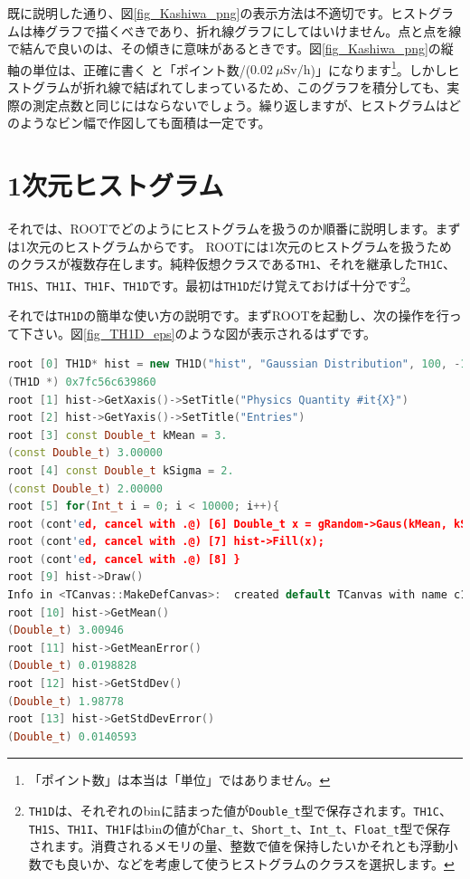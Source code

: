 既に説明した通り、図\ref{fig_Kashiwa_png}の表示方法は不適切です。ヒストグラムは棒グラフで描くべきであり、折れ線グラフにしてはいけません。点と点を線で結んで良いのは、その傾きに意味があるときです。図\ref{fig_Kashiwa_png}の縦軸の単位は、正確に書く と「ポイント数/($0.02\ \mu\mathrm{Sv/h}$)」になります\footnote{「ポイント数」は本当は「単位」ではありません。}。しかしヒストグラムが折れ線で結ばれてしまっているため、このグラフを積分しても、実際の測定点数と同じにはならないでしょう。繰り返しますが、ヒストグラムはどのようなビン幅で作図しても面積は一定です。

\section{1次元ヒストグラム}

それでは、ROOTでどのようにヒストグラムを扱うのか順番に説明します。まずは1次元のヒストグラムからです。 ROOTには1次元のヒストグラムを扱うためのクラスが複数存在します。純粋仮想クラスである\texttt{TH1}、それを継承した\texttt{TH1C}、\texttt{TH1S}、\texttt{TH1I}、\texttt{TH1F}、\texttt{TH1D}です。最初は\texttt{TH1D}だけ覚えておけば十分です\footnote{\texttt{TH1D}は、それぞれのbinに詰まった値が\texttt{Double\_t}型で保存されます。\texttt{TH1C}、\texttt{TH1S}、\texttt{TH1I}、\texttt{TH1F}はbinの値が\texttt{Char\_t}、\texttt{Short\_t}、\texttt{Int\_t}、\texttt{Float\_t}型で保存されます。消費されるメモリの量、整数で値を保持したいかそれとも浮動小数でも良いか、などを考慮して使うヒストグラムのクラスを選択します。}。

それでは\texttt{TH1D}の簡単な使い方の説明です。まずROOTを起動し、次の操作を行って下さい。図\ref{fig_TH1D_eps}のような図が表示されるはずです。

\begin{lstlisting}[language=c++]
root [0] TH1D* hist = new TH1D("hist", "Gaussian Distribution", 100, -10, 10)
(TH1D *) 0x7fc56c639860
root [1] hist->GetXaxis()->SetTitle("Physics Quantity #it{X}")
root [2] hist->GetYaxis()->SetTitle("Entries")
root [3] const Double_t kMean = 3.
(const Double_t) 3.00000
root [4] const Double_t kSigma = 2.
(const Double_t) 2.00000
root [5] for(Int_t i = 0; i < 10000; i++){
root (cont'ed, cancel with .@) [6] Double_t x = gRandom->Gaus(kMean, kSigma);
root (cont'ed, cancel with .@) [7] hist->Fill(x);
root (cont'ed, cancel with .@) [8] }
root [9] hist->Draw()
Info in <TCanvas::MakeDefCanvas>:  created default TCanvas with name c1
root [10] hist->GetMean()
(Double_t) 3.00946
root [11] hist->GetMeanError()
(Double_t) 0.0198828
root [12] hist->GetStdDev()
(Double_t) 1.98778
root [13] hist->GetStdDevError()
(Double_t) 0.0140593
\end{lstlisting}

